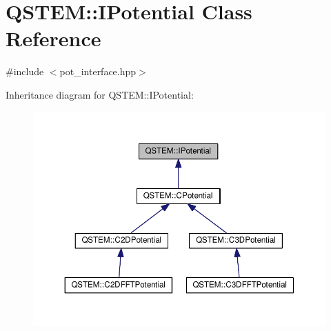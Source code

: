 \hypertarget{class_q_s_t_e_m_1_1_i_potential}{\section{Q\-S\-T\-E\-M\-:\-:I\-Potential Class Reference}
\label{class_q_s_t_e_m_1_1_i_potential}
}


{\ttfamily \#include $<$pot\-\_\-interface.\-hpp$>$}



Inheritance diagram for Q\-S\-T\-E\-M\-:\-:I\-Potential\-:
\nopagebreak
\begin{figure}[H]
\begin{center}
\leavevmode
\includegraphics[width=350pt]{class_q_s_t_e_m_1_1_i_potential__inherit__graph}
\end{center}
\end{figure}
